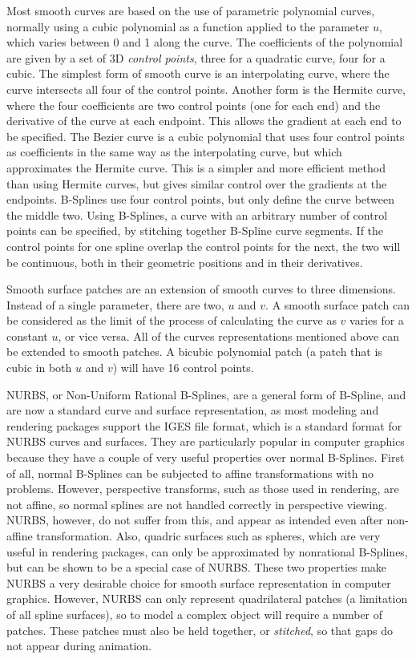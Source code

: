 \documentclass[10pt,oneside,fleqn,a4paper]{book}
\begin{document}
Most smooth curves are based on the use of parametric polynomial curves, normally using a cubic polynomial as a function applied to the parameter $u$, which varies between 0 and 1 along the curve. The coefficients of the polynomial are given by a set of 3D {\it control points}, three for a quadratic curve, four for a cubic. The simplest form of smooth curve is an interpolating curve, where the curve intersects all four of the control points. Another form is the Hermite curve, where the four coefficients are two control points (one for each end) and the derivative of the curve at each endpoint. This allows the gradient at each end to be specified. The Bezier curve is a cubic polynomial that uses four control points as coefficients in the same way as the interpolating curve, but which approximates the Hermite curve. This is a simpler and more efficient method than using Hermite curves, but gives similar control over the gradients at the endpoints. B-Splines use four control points, but only define the curve between the middle two. Using B-Splines, a curve with an arbitrary number of control points can be specified, by stitching together B-Spline curve segments. If the control points for one spline overlap the control points for the next, the two will be continuous, both in their geometric positions and in their derivatives.

Smooth surface patches are an extension of smooth curves to three dimensions. Instead of a single parameter, there are two, $u$ and $v$. A smooth surface patch can be considered as the limit of the process of calculating the curve as $v$ varies for a constant $u$, or vice versa. All of the curves representations mentioned above can be extended to smooth patches. A bicubic polynomial patch (a patch that is cubic in both $u$ and $v$) will have 16 control points.

NURBS, or Non-Uniform Rational B-Splines, are a general form of B-Spline, and are now a standard curve and surface representation, as most modeling and rendering packages support the IGES file format, which is a standard format for NURBS curves and surfaces. They are particularly popular in computer graphics because they have a couple of very useful properties over normal B-Splines. First of all, normal B-Splines can be subjected to affine transformations with no problems. However, perspective transforms, such as those used in rendering, are not affine, so normal splines are not handled correctly in perspective viewing. NURBS, however, do not suffer from this, and appear as intended even after non-affine transformation. Also, quadric surfaces such as spheres, which are very useful in rendering packages, can only be approximated by nonrational B-Splines, but can be shown to be a special case of NURBS. These two properties make NURBS a very desirable choice for smooth surface representation in computer graphics. However, NURBS can only represent quadrilateral patches (a limitation of all spline surfaces), so to model a complex object will require a number of patches. These patches must also be held together, or {\it stitched}, so that gaps do not appear during animation.
\end{document}

